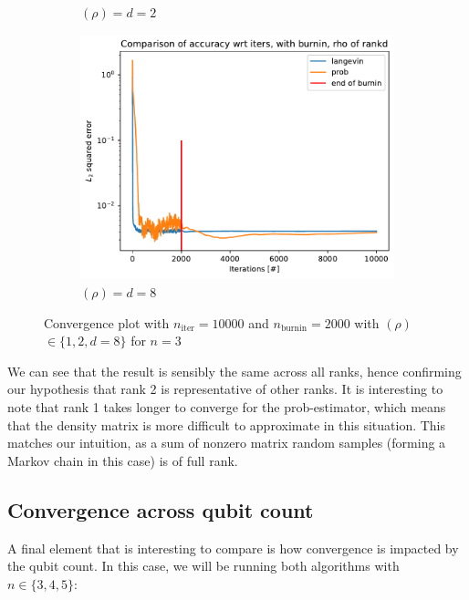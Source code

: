 \documentclass[12pt]{memoir}
\newcommand{\nitern}[1]{$n_{\text{iter}}=#1$}
\newcommand{\nburninn}[1]{$n_{\text{burnin}}=#1$}
\newcommand{\rhorankn}[1]{\text{rank}$(\rho)=#1$}
\newcommand{\rhorank}[0]{\text{rank}$(\rho) $ }
\begin{document}
\begin{figure}[H]
\begin{subfigure}[b]{0.49\textwidth}
        \caption{\rhorankn{d=2}}
        \label{fig:conv-plot-diff-rank-2-sub}
    \end{subfigure}
    \begin{subfigure}[b]{0.49\textwidth}
        \centering
        \includegraphics[width=\textwidth]{figures/experiments/baseline/diff_rank/iters_acc_comp_iters_no_avg_rankd-1.png}
        \caption{\rhorankn{d=8}}
        \label{fig:conv-plot-diff-rank-d-sub}
    \end{subfigure}
    \caption{Convergence plot with \nitern{10000} and \nburninn{2000} with \rhorank $\in \{1,2,d=8\}$ for $n=3$  }
    \label{fig:conv-plot-diff-rank}
\end{figure}

We can see that the result is sensibly the same across all ranks, hence confirming our hypothesis that rank 2 is representative of other ranks. It is interesting to note that rank 1 takes longer to converge for the prob-estimator, which means that the density matrix is more difficult to approximate in this situation. This matches our intuition, as a sum of nonzero matrix random samples (forming a Markov chain in this case) is of full rank.

\subsection*{Convergence across qubit count}

A final element that is interesting to compare is how convergence is impacted by the qubit count. In this case, we will be running both algorithms with $n\in\{3,4,5\}$:
\end{document}

